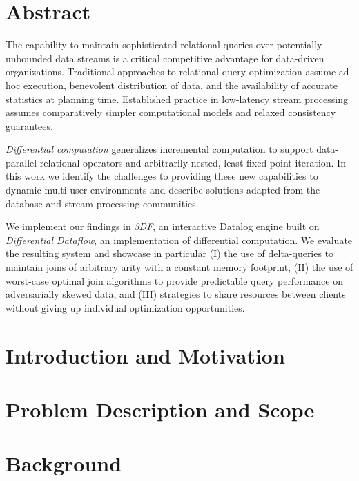 \documentclass{article}
\begin{document}
\tableofcontents

\newpage

\section{Abstract} \label{abstract}

The capability to maintain sophisticated relational queries over
potentially unbounded data streams is a critical competitive advantage
for data-driven organizations. Traditional approaches to relational
query optimization assume ad-hoc execution, benevolent distribution of
data, and the availability of accurate statistics at planning
time. Established practice in low-latency stream processing assumes
comparatively simpler computational models and relaxed consistency
guarantees.

\emph{Differential computation} generalizes incremental computation to
support data-parallel relational operators and arbitrarily nested,
least fixed point iteration. In this work we identify the challenges
to providing these new capabilities to dynamic multi-user environments
and describe solutions adapted from the database and stream processing
communities.

We implement our findings in \emph{3DF}, an interactive Datalog engine
built on \emph{Differential Dataflow}, an implementation of
differential computation. We evaluate the resulting system and
showcase in particular (I) the use of delta-queries to maintain joins
of arbitrary arity with a constant memory footprint, (II) the use of
worst-case optimal join algorithms to provide predictable query
performance on adversarially skewed data, and (III) strategies to
share resources between clients without giving up individual
optimization opportunities.

\newpage

\section{Introduction and Motivation} \label{intro}

\newpage

\section{Problem Description and Scope} \label{problem}

\newpage

\section{Background} \label{background}

\newpage
\end{document}
